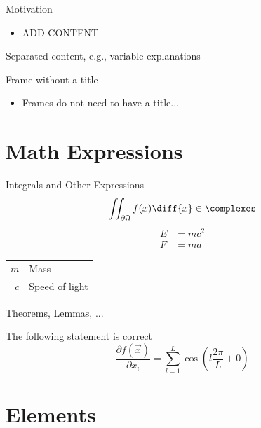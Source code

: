 \begin{frame}{Motivation}
				\begin{itemize}
								\item {ADD CONTENT}
				\end{itemize}

				\seprule

				Separated content, e.g., variable explanations
\end{frame}
\begin{frame}
				Frame without a title
				\begin{itemize}
								\item Frames do not need to have a title...
				\end{itemize}
\end{frame}

\section{Math Expressions}
\begin{frame}{Integrals and Other Expressions}
				\begin{equation}
								\iint_{\partial\Omega}f(x)\diff{x} \in \complexes
				\end{equation}
				\begin{align}
								E &= mc^2\\
								F &= ma
				\end{align}

				\seprule

				\begin{tabular}{rl}
								$m$ & Mass\\
								$c$ & Speed of light
				\end{tabular}
\end{frame}
\begin{frame}{Theorems, Lemmas, ...}
				\begin{thm}
								The following statement is correct
								\begin{equation}
												\frac{\partial f(\vec{x})}{\partial x_i} =
												\sum_{l=1}^{L}\cos\left(l\frac{2\pi}{L} + 0\right)
								\end{equation}
				\end{thm}
\end{frame}

\section{Elements}

